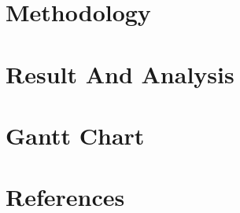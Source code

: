 \documentclass[12pt,a4paper]{report}
\begin{document}
\chapter{Methodology}
\label{methodology}


\chapter{Result And Analysis}
\label{result}


\chapter*{Gantt Chart}
\label{ganttchart}


\chapter*{References}
\label{references}

\end{document}
